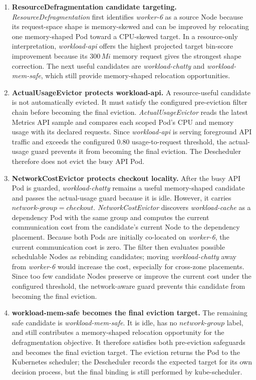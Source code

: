 \begin{enumerate}
    \item \textbf{ResourceDefragmentation candidate targeting.}
    \textit{ResourceDefragmentation} first identifies \textit{worker-6} as a source Node because its request-space shape is memory-skewed and can be improved by relocating one memory-shaped Pod toward a CPU-skewed target. In a resource-only interpretation, \textit{workload-api} offers the highest projected target bin-score improvement because its $300\,Mi$ memory request gives the strongest shape correction. The next useful candidates are \textit{workload-chatty} and \textit{workload-mem-safe}, which still provide memory-shaped relocation opportunities.

    \item \textbf{ActualUsageEvictor protects workload-api.}
    A resource-useful candidate is not automatically evicted. It must satisfy the configured pre-eviction filter chain before becoming the final eviction. \textit{ActualUsageEvictor} reads the latest Metrics API sample and compares each scoped Pod's CPU and memory usage with its declared requests. Since \textit{workload-api} is serving foreground API traffic and exceeds the configured $0.80$ usage-to-request threshold, the actual-usage guard prevents it from becoming the final eviction. The Descheduler therefore does not evict the busy API Pod.

    \item \textbf{NetworkCostEvictor protects checkout locality.}
    After the busy API Pod is guarded, \textit{workload-chatty} remains a useful memory-shaped candidate and passes the actual-usage guard because it is idle. However, it carries $network\mbox{-}group=checkout$. \textit{NetworkCostEvictor} discovers \textit{workload-cache} as a dependency Pod with the same group and computes the current communication cost from the candidate's current Node to the dependency placement. Because both Pods are initially co-located on \textit{worker-6}, the current communication cost is zero. The filter then evaluates possible schedulable Nodes as rebinding candidates; moving \textit{workload-chatty} away from \textit{worker-6} would increase the cost, especially for cross-zone placements. Since too few candidate Nodes preserve or improve the current cost under the configured threshold, the network-aware guard prevents this candidate from becoming the final eviction.

    \item \textbf{workload-mem-safe becomes the final eviction target.}
    The remaining safe candidate is \textit{workload-mem-safe}. It is idle, has no $network\mbox{-}group$ label, and still contributes a memory-shaped relocation opportunity for the defragmentation objective. It therefore satisfies both pre-eviction safeguards and becomes the final eviction target. The eviction returns the Pod to the Kubernetes scheduler; the Descheduler records the expected target for its own decision process, but the final binding is still performed by kube-scheduler.
\end{enumerate}

